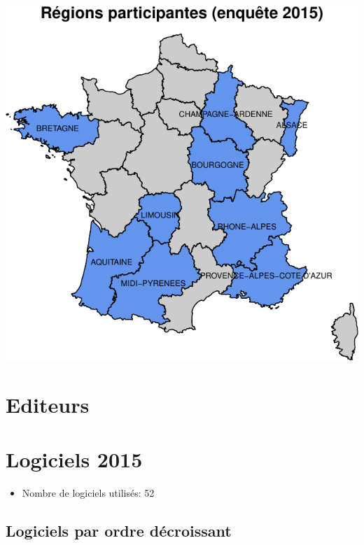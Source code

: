\documentclass[]{article}
\begin{document}
\includegraphics{septembre2015_files/figure-latex/carto_region-1.pdf}

\section{Editeurs}\label{editeurs}

\section{Logiciels 2015}\label{logiciels-2015}

\begin{itemize}
\itemsep1pt\parskip0pt
\item
  Nombre de logiciels utilisés: 52
\end{itemize}

\subsection{Logiciels par ordre
décroissant}\label{logiciels-par-ordre-decroissant}
\end{document}
